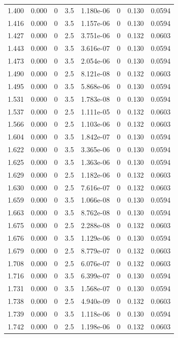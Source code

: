 \documentclass[preview]{standalone}
\begin{document}
{{{\begin{tabular}{L{1.2cm}C{1.2cm} C{0.3cm}C{0.5cm} C{1.4cm}C{1.4cm} C{1.4cm}C{1.4cm}}
  1.400  &  0.000  & 0     & 3.5 &  1.180e-06  & 0  & 0.130 &  0.0594   \\ 
  1.416  &  0.000  & 0     & 3.5 &  1.157e-06  & 0  & 0.130 &  0.0594   \\ 
  1.427  &  0.000  & 0     & 2.5 &  3.751e-06  & 0  & 0.132 &  0.0603   \\ 
  1.443  &  0.000  & 0     & 3.5 &  3.616e-07  & 0  & 0.130 &  0.0594   \\ 
  1.473  &  0.000  & 0     & 3.5 &  2.054e-06  & 0  & 0.130 &  0.0594   \\ 
  1.490  &  0.000  & 0     & 2.5 &  8.121e-08  & 0  & 0.132 &  0.0603   \\ 
  1.495  &  0.000  & 0     & 3.5 &  5.868e-06  & 0  & 0.130 &  0.0594   \\ 
  1.531  &  0.000  & 0     & 3.5 &  1.783e-08  & 0  & 0.130 &  0.0594   \\ 
  1.537  &  0.000  & 0     & 2.5 &  1.111e-05  & 0  & 0.132 &  0.0603   \\ 
  1.566  &  0.000  & 0     & 2.5 &  1.103e-06  & 0  & 0.132 &  0.0603   \\ 
  1.604  &  0.000  & 0     & 3.5 &  1.842e-07  & 0  & 0.130 &  0.0594   \\ 
  1.622  &  0.000  & 0     & 3.5 &  3.365e-06  & 0  & 0.130 &  0.0594   \\ 
  1.625  &  0.000  & 0     & 3.5 &  1.363e-06  & 0  & 0.130 &  0.0594   \\ 
  1.629  &  0.000  & 0     & 2.5 &  1.182e-06  & 0  & 0.132 &  0.0603   \\ 
  1.630  &  0.000  & 0     & 2.5 &  7.616e-07  & 0  & 0.132 &  0.0603   \\ 
  1.659  &  0.000  & 0     & 3.5 &  1.066e-08  & 0  & 0.130 &  0.0594   \\ 
  1.663  &  0.000  & 0     & 3.5 &  8.762e-08  & 0  & 0.130 &  0.0594   \\ 
  1.675  &  0.000  & 0     & 2.5 &  2.288e-08  & 0  & 0.132 &  0.0603   \\ 
  1.676  &  0.000  & 0     & 3.5 &  1.129e-06  & 0  & 0.130 &  0.0594   \\ 
  1.679  &  0.000  & 0     & 2.5 &  8.779e-07  & 0  & 0.132 &  0.0603   \\ 
  1.708  &  0.000  & 0     & 2.5 &  6.076e-07  & 0  & 0.132 &  0.0603   \\ 
  1.716  &  0.000  & 0     & 3.5 &  6.399e-07  & 0  & 0.130 &  0.0594   \\ 
  1.731  &  0.000  & 0     & 3.5 &  1.568e-07  & 0  & 0.130 &  0.0594   \\ 
  1.738  &  0.000  & 0     & 2.5 &  4.940e-09  & 0  & 0.132 &  0.0603   \\ 
  1.739  &  0.000  & 0     & 3.5 &  1.118e-06  & 0  & 0.130 &  0.0594   \\ 
  1.742  &  0.000  & 0     & 2.5 &  1.198e-06  & 0  & 0.132 &  0.0603   \\ 
\hline 
\end{tabular} 

}}}
\end{document}
